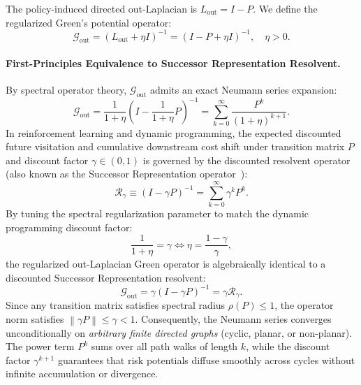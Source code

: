 \documentclass[11pt,a4paper]{article}
\begin{document}
The policy-induced directed out-Laplacian is $L_{\text{out}} = I - P$. We define the regularized Green's potential operator:
\begin{equation}
\mathcal{G}_{\text{out}} = (L_{\text{out}} + \eta I)^{-1} = (I - P + \eta I)^{-1}, \quad \eta > 0.
\end{equation}

\paragraph{First-Principles Equivalence to Successor Representation Resolvent.}
By spectral operator theory, $\mathcal{G}_{\text{out}}$ admits an exact Neumann series expansion:
\begin{equation}
\label{eq:neumann_series}
\mathcal{G}_{\text{out}} = \frac{1}{1 + \eta} \left( I - \frac{1}{1 + \eta} P \right)^{-1} = \sum_{k=0}^{\infty} \frac{P^k}{(1 + \eta)^{k+1}}.
\end{equation}
In reinforcement learning and dynamic programming, the expected discounted future visitation and cumulative downstream cost shift under transition matrix $P$ and discount factor $\gamma \in (0, 1)$ is governed by the discounted resolvent operator (also known as the Successor Representation operator~\cite{mahadevan2007proto}):
\begin{equation}
\label{eq:successor_representation}
\mathcal{R}_\gamma \equiv (I - \gamma P)^{-1} = \sum_{k=0}^\infty \gamma^k P^k.
\end{equation}
By tuning the spectral regularization parameter to match the dynamic programming discount factor:
\begin{equation}
\label{eq:eta_gamma_tuning}
\frac{1}{1 + \eta} = \gamma \iff \eta = \frac{1 - \gamma}{\gamma},
\end{equation}
the regularized out-Laplacian Green operator is algebraically identical to a discounted Successor Representation resolvent:
\begin{equation}
\label{eq:g_out_resolvent_identity}
\mathcal{G}_{\text{out}} = \gamma (I - \gamma P)^{-1} = \gamma \mathcal{R}_\gamma.
\end{equation}
Since any transition matrix satisfies spectral radius $\rho(P) \le 1$, the operator norm satisfies $\left\| \gamma P \right\| \le \gamma < 1$. Consequently, the Neumann series converges unconditionally on \textit{arbitrary finite directed graphs} (cyclic, planar, or non-planar). The power term $P^k$ sums over all path walks of length $k$, while the discount factor $\gamma^{k+1}$ guarantees that risk potentials diffuse smoothly across cycles without infinite accumulation or divergence.
\end{document}
